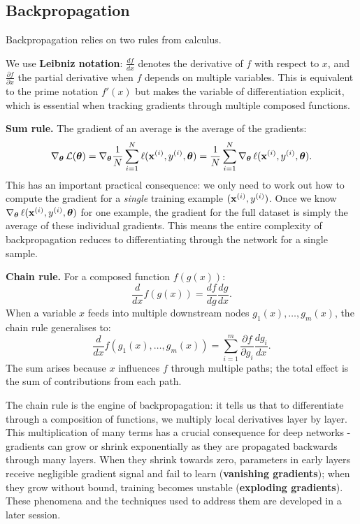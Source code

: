 \subsection{Backpropagation}

Backpropagation relies on two rules from calculus.

\begin{remark}
We use \textbf{Leibniz notation}: $\frac{df}{dx}$ denotes the derivative of $f$ with respect to $x$, and $\frac{\partial f}{\partial x}$ the partial derivative when $f$ depends on multiple variables. This is equivalent to the prime notation $f'(x)$ but makes the variable of differentiation explicit, which is essential when tracking gradients through multiple composed functions.
\end{remark}

\textbf{Sum rule.} The gradient of an average is the average of the gradients:
\begin{equation}
\nabla_{\boldsymbol{\theta}}\, \mathcal{L}(\boldsymbol{\theta})
= \nabla_{\boldsymbol{\theta}} \frac{1}{N}\sum_{i=1}^{N} \ell(\mathbf{x}^{(i)}, y^{(i)}, \boldsymbol{\theta})
= \frac{1}{N}\sum_{i=1}^{N} \nabla_{\boldsymbol{\theta}}\, \ell(\mathbf{x}^{(i)}, y^{(i)}, \boldsymbol{\theta}).
\end{equation}
This has an important practical consequence: we only need to work out how to compute the gradient for a \emph{single} training example $(\mathbf{x}^{(i)}, y^{(i)})$. Once we know $\nabla_{\boldsymbol{\theta}}\, \ell(\mathbf{x}^{(i)}, y^{(i)}, \boldsymbol{\theta})$ for one example, the gradient for the full dataset is simply the average of these individual gradients. This means the entire complexity of backpropagation reduces to differentiating through the network for a single sample.

\textbf{Chain rule.} For a composed function $f(g(x))$:
\begin{equation}
\frac{d}{dx} f(g(x)) = \frac{df}{dg}\frac{dg}{dx}.
\end{equation}
When a variable $x$ feeds into multiple downstream nodes $g_1(x), \ldots, g_m(x)$, the chain rule generalises to:
\begin{equation}
\frac{d}{dx} f(g_1(x), \ldots, g_m(x)) = \sum_{i=1}^{m} \frac{\partial f}{\partial g_i}\frac{dg_i}{dx}.
\end{equation}
The sum arises because $x$ influences $f$ through multiple paths; the total effect is the sum of contributions from each path.

The chain rule is the engine of backpropagation: it tells us that to differentiate through a composition of functions, we multiply local derivatives layer by layer. This multiplication of many terms has a crucial consequence for deep networks - gradients can grow or shrink exponentially as they are propagated backwards through many layers. When they shrink towards zero, parameters in early layers receive negligible gradient signal and fail to learn (\textbf{vanishing gradients}); when they grow without bound, training becomes unstable (\textbf{exploding gradients}). These phenomena and the techniques used to address them are developed in a later session.

